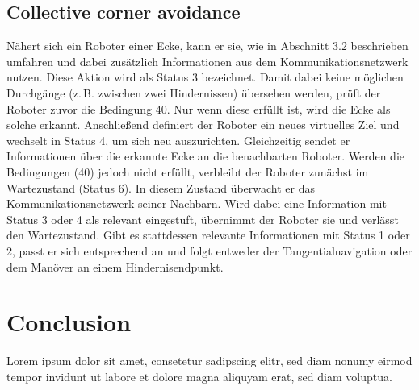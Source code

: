 \documentclass[conference]{IEEEtran}
\begin{document}
\subsection{Collective corner avoidance}
Nähert sich ein Roboter einer Ecke, kann er sie, wie in Abschnitt 3.2 beschrieben umfahren und dabei zusätzlich Informationen aus dem Kommunikationsnetzwerk nutzen. Diese Aktion wird als Status 3 bezeichnet. Damit dabei keine möglichen Durchgänge (z. B. zwischen zwei Hindernissen) übersehen werden, prüft der Roboter zuvor die Bedingung 40. Nur wenn diese erfüllt ist, wird die Ecke als solche erkannt.
Anschließend definiert der Roboter ein neues virtuelles Ziel und wechselt in Status 4, um sich neu auszurichten. Gleichzeitig sendet er Informationen über die erkannte Ecke an die benachbarten Roboter.
Werden die Bedingungen (40) jedoch nicht erfüllt, verbleibt der Roboter zunächst im Wartezustand (Status 6). In diesem Zustand überwacht er das Kommunikationsnetzwerk seiner Nachbarn.
Wird dabei eine Information mit Status 3 oder 4 als relevant eingestuft, übernimmt der Roboter sie und verlässt den Wartezustand. Gibt es stattdessen relevante Informationen mit Status 1 oder 2, passt er sich entsprechend an und folgt entweder der Tangentialnavigation oder dem Manöver an einem Hindernisendpunkt.


\section{Conclusion}
Lorem ipsum dolor sit amet, consetetur sadipscing elitr, sed diam nonumy eirmod tempor invidunt ut labore et dolore magna aliquyam erat, sed diam voluptua.




\end{document}

